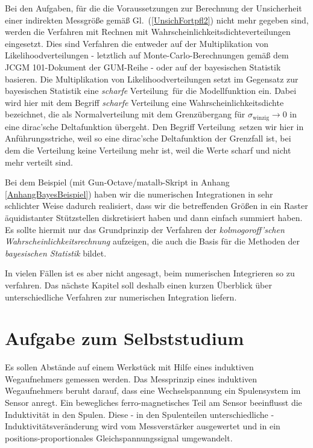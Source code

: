 Bei den Aufgaben, für die die Voraussetzungen zur Berechnung der Unsicherheit einer
indirekten Messgröße gemäß Gl.~(\ref{UnsichFortpfl2}) nicht mehr gegeben sind, werden die
Verfahren mit Rechnen mit Wahrscheinlichkeitsdichteverteilungen eingesetzt.
Dies sind Verfahren die entweder auf der Multiplikation von Likelihoodverteilungen - letztlich
auf Monte-Carlo-Berechnungen gemäß dem JCGM 101-Dokument der GUM-Reihe - oder auf der
bayesischen Statistik basieren.
Die Multiplikation von Likelihoodverteilungen setzt im Gegensatz zur bayesischen Statistik eine
\textsl{scharfe} \glqq Verteilung\grqq ~für die Modellfunktion ein. Dabei wird hier mit dem Begriff
\textsl{scharfe} Verteilung eine Wahrscheinlichkeitsdichte bezeichnet, die als Normalverteilung
mit dem Grenzübergang für $\sigma_\mathrm{winzig} \rightarrow 0$ in eine dirac'sche Deltafunktion übergeht.
Den Begriff \glqq Verteilung\grqq ~setzen wir hier in Anführungsstriche, weil
so eine dirac'sche Deltafunktion der Grenzfall ist, bei dem die Verteilung keine Verteilung mehr ist,
weil die Werte scharf und nicht mehr verteilt sind.

Bei dem Beispiel (mit Gun-Octave/matalb-Skript in Anhang \ref{AnhangBayesBeispiel})
haben wir die numerischen Integrationen in
sehr schlichter Weise dadurch realisiert, dass wir die betreffenden Größen in ein Raster äquidistanter
Stützstellen diskretisiert haben und dann einfach summiert haben. Es sollte hiermit nur das Grundprinzip der
Verfahren der \textsl{kolmogoroff'schen Wahrscheinlichkeitsrechnung} aufzeigen, die auch die Basis für die
Methoden der \textsl{bayesischen Statistik} bildet.

In vielen Fällen ist es aber nicht angesagt, beim numerischen Integrieren so zu verfahren.
Das nächste Kapitel soll deshalb einen kurzen
Überblick über unterschiedliche Verfahren zur numerischen Integration liefern.


\section{Aufgabe zum Selbststudium}
\label{AufgVor7}
Es sollen Abstände auf einem Werkstück mit Hilfe eines induktiven Wegaufnehmers gemessen werden.
Das Messprinzip eines induktiven Wegaufnehmers beruht darauf, dass
eine Wechselspannung ein Spulensystem im Sensor anregt.
Ein bewegliches ferro-magnetisches Teil am Sensor
beeinflusst die Induktivität in den Spulen.
Diese - in den Spulenteilen unterschiedliche - Induktivitätsveränderung wird vom
Messverstärker ausgewertet und in ein positions-proportionales Gleichspannungssignal
umgewandelt.

